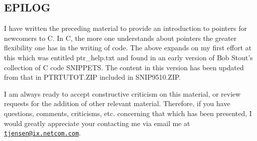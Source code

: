 \hypertarget{epilog}{%
\subsection{EPILOG}\label{epilog}}

I have written the preceding material to provide an introduction to
pointers for newcomers to C. In C, the more one understands about
pointers the greater flexibility one has in the writing of code. The
above expands on my first effort at this which was entitled
ptr\_help.txt and found in an early version of Bob Stout's collection of
C code SNIPPETS. The content in this version has been updated from that
in PTRTUTOT.ZIP included in SNIP9510.ZIP.

I am always ready to accept constructive criticism on this material, or
review requests for the addition of other relevant material. Therefore,
if you have questions, comments, criticisms, etc. concerning that which
has been presented, I would greatly appreciate your contacting me via
email me at
\href{mailto:tjensen@ix.netcom.com}{\nolinkurl{tjensen@ix.netcom.com}}.\\

\begin{comment}
\href{pointers.htm}{Back to Table of Contents}
\end{comment}
